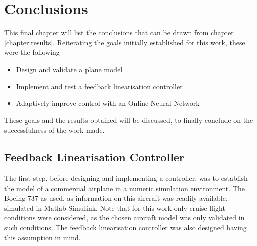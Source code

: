 
\chapter{Conclusions}
\label{chapter:conclusions}

This final chapter will list the conclusions that can be drawn from chapter \ref{chapter:results}. Reiterating the goals initially established for this work, these were the following

\begin{itemize}
\item Design and validate a plane model
\item Implement and test a feedback linearisation controller
\item Adaptively improve control with an Online Neural Network
\end{itemize}

These goals and the results obtained will be discussed, to finally conclude on the successfulness of the work made. 

\section{Feedback Linearisation Controller}
\label{section:conclusions/fbl_controller}

The first step, before designing and implementing a controller, was to establish the model of a commercial airplane in a numeric simulation environment. The Boeing 737 as used, as information on this aircraft was readily available, simulated in Matlab Simulink. Note that for this work only cruise flight conditions were considered, as the chosen aircraft model was only validated in such conditions. The feedback linearisation controller was also designed having this assumption in mind. 

